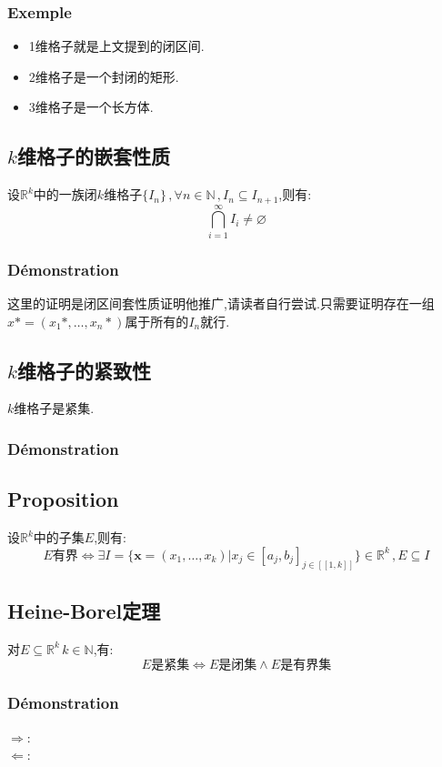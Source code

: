\documentclass[12pt, a4paper, oneside]{ctexbook}
\newcommand{\R }{\mathbb{R}}%
\begin{document}
  \subsubsection{Exemple}
  \begin{itemize}
    \item 1维格子就是上文提到的闭区间.
    \item 2维格子是一个封闭的矩形.
    \item 3维格子是一个长方体.
  \end{itemize}
  \subsection{$k$维格子的嵌套性质}
  设$\R^k$中的一族闭$k$维格子$\{I_n \}\,, \forall n\in \mathbb{N}\,,I_n\subseteq I_{n+1}$,则有:
  $$
    \bigcap_{i=1}^\infty I_i\neq \varnothing
  $$
  \subsubsection{Démonstration}
  这里的证明是闭区间套性质证明他推广,请读者自行尝试.只需要证明存在一组$x*=(x_1*,\dots,x_n*)$属于所有的$I_n$就行.

  \subsection{$k$维格子的紧致性}
  $k$维格子是紧集.
  \subsubsection{Démonstration}

  \subsection{Proposition}
  设$\R^k$中的子集$E$,则有:
  $$
  E\text{有界}\Leftrightarrow\exists I=\{\textbf{x}=(x_1,\dots,x_k)|x_j\in[a_j,b_j]_{j\in[\![1,k]\!]} \}\in \R^k\,, E\subseteq I
  $$
  \subsection{Heine-Borel定理}
  对$E\subseteq \R^k\, k\in \mathbb{N}$,有:
  $$
  E\text{是紧集}\Leftrightarrow E\text{是闭集}\land E\text{是有界集}
  $$
  \subsubsection{Démonstration}
  \noindent
  $\Rightarrow$:\\
  $\Leftarrow$:\\
\end{document}
